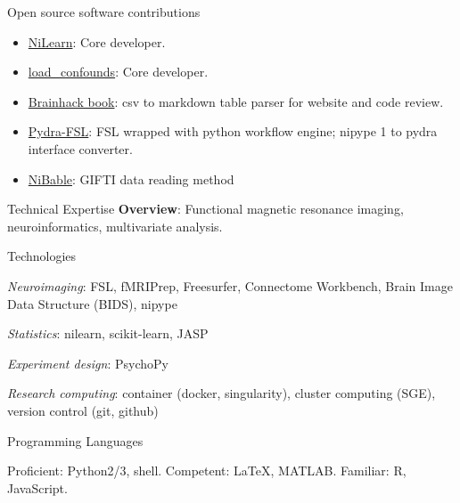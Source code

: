 \documentclass{resume} %
\begin{document}
\begin{rSection}{Open source software contributions}
  \begin{itemize}
      \item \href{https://github.com/nilearn/nilearn}{NiLearn}: Core developer.
      \item \href{https://github.com/SIMEXP/load_confounds}{load\_confounds}: Core developer.
      \item \href{https://github.com/brainhackorg/brainhack_jupyter_book}{Brainhack book}: csv to markdown table parser for website and code review.
      \item \href{https://github.com/nipype/pydra-fsl}{Pydra-FSL}: FSL wrapped with python workflow engine; nipype 1 to pydra interface converter.
      \item \href{https://github.com/nipy/nibabel/pull/793}{NiBable}: GIFTI data reading method
  \end{itemize}
\end{rSection}


\begin{rSection}{Technical Expertise}
  \textbf{Overview}: Functional magnetic resonance imaging,
  neuroinformatics, multivariate analysis.

\begin{rSubsection}{Technologies}{}{}{}
  \item \textit{Neuroimaging}: FSL, fMRIPrep, Freesurfer, Connectome Workbench,
                      Brain Image Data Structure (BIDS), nipype
  \item \textit{Statistics}:  nilearn, scikit-learn, JASP
  \item \textit{Experiment design}: PsychoPy
  \item \textit{Research computing}: container (docker, singularity),
                            cluster computing (SGE),
                            version control (git, github)
\end{rSubsection}
\begin{rSubsection}{Programming Languages}{}{}{}
  \item Proficient: Python2/3, shell. Competent: \LaTeX, MATLAB. Familiar: R, JavaScript.
\end{rSubsection}

\end{rSection}
\end{document}
